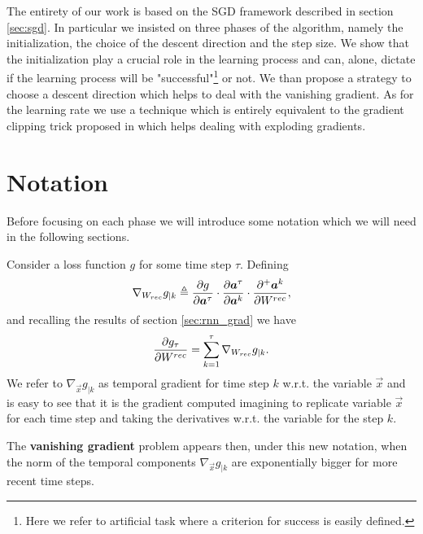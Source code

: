 The entirety of our work is based on the SGD framework described in section \ref{sec:sgd}. In particular we insisted on three phases of the algorithm, namely the initialization, the choice of the descent direction and the step size. We show that the initialization play a crucial role in the learning process and can, alone, dictate if the learning process will be "successful"\footnote{Here we refer to artificial task where a criterion for success is easily defined.} or not. We than propose a strategy to choose a descent direction which helps to deal with the vanishing gradient. As for the learning rate we use a technique which is entirely equivalent to the gradient clipping trick proposed in \cite{understandingExplodingGradients} which helps dealing with exploding gradients.


\section{Notation}
Before focusing on each phase we will introduce some notation which we will need in the following sections.

Consider a loss function $g$ for some time step $\tau$. Defining 
\begin{equation}
\nabla_{W_{rec}} g_{|k}  \triangleq \frac{\partial g}{\partial \boldsymbol{a}^{\tau}} \cdot \frac{\partial \boldsymbol{a}^{\tau}}{\partial \boldsymbol{a}^k} \cdot \frac{\partial^+ \boldsymbol{a}^k}{\partial W^{rec}},
\end{equation}
and recalling the results of section \ref{sec:rnn_grad} we have
\begin{equation}
	\frac{\partial g_{\tau}}{\partial W^{rec}} = \sum_{k=1}^{\tau} \nabla_{W_{rec}} g_{|k}.
\end{equation}
We refer to $\nabla_{\vec{x}} g_{|k}$ as temporal gradient for time step $k$ w.r.t. the variable $\vec{x}$ and is easy to see that it is the gradient computed imagining to replicate variable $\vec{x}$ for each time step and taking the derivatives w.r.t. the variable for the step $k$.

The \textbf{vanishing gradient} problem appears then, under this new notation, when the norm of the temporal components $\nabla_{\vec{x}} g_{|k}$ are exponentially bigger for more recent time steps.

